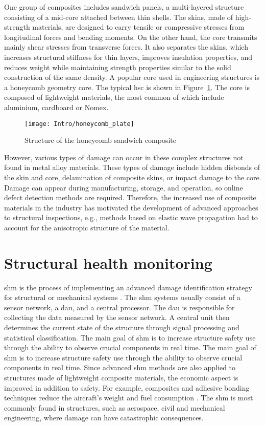 \documentclass[11pt,a4paper,final]{report}
\theoremstyle{plain}
\begin{document}
One group of composites includes sandwich panels, a multi-layered structure consisting of a mid-core attached between thin shells.
The skins, made of high-strength materials, are designed to carry tensile or compressive stresses from longitudinal forces and bending moments.
On the other hand, the core transmits mainly shear stresses from transverse forces.
It also separates the skins, which increases structural stiffness for thin layers, improves insulation properties, and reduces weight while maintaining strength properties similar to the solid construction of the same density.
A popular core used in engineering structures is a honeycomb geometry core. 
The typical \ac{hsc} is shown in Figure~\ref{fig:hcp}.
The core is composed of lightweight materials, the most common of which include aluminium, cardboard or Nomex\textsuperscript{\tiny\textregistered}.
\begin{figure}[H] \begin{center}
		\texttt{[image: Intro/honeycomb\_plate]}
		\caption{
			\label{fig:hcp} Structure of the honeycomb sandwich composite}
		\vspace{-0.5cm}
	\end{center}
\end{figure}

However, various types of damage can occur in these complex structures not found in metal alloy materials. These types of damage include hidden disbonds of the skin and core, delamination of composite skins, or impact damage to the core.
Damage can appear during manufacturing, storage, and operation, so online defect detection methods are required.
Therefore, the increased use of composite materials in the industry has motivated the development of advanced approaches to structural inspections, e.g., methods based on elastic wave propagation had to account for the anisotropic structure of the material. \section{Structural health monitoring}
\label{sec:scm}

\Ac{shm} is the process of implementing an advanced damage identification strategy for structural or mechanical systems \cite{farrar2007introduction}.
The \ac{shm} systems usually consist of a sensor network, a \ac{dau}, and a central processor.
The \ac{dau} is responsible for collecting the data measured by the sensor network.
A central unit then determines the current state of the structure through signal processing and statistical classification.
The main goal of \ac{shm} is to increase structure safety use through the ability to observe crucial components in real time. 
The main goal of \ac{shm} is to increase structure safety use through the ability to observe crucial components in real time.
Since advanced \ac{shm} methods are also applied to structures made of lightweight composite materials, the economic aspect is improved in addition to safety.
For example, composites and adhesive bonding techniques reduce the aircraft's weight and fuel consumption \cite{scelsi2011potential}.
The \ac{shm} is most commonly found in structures, such as aerospace, civil and mechanical engineering, where damage can have catastrophic consequences.
\end{document}
